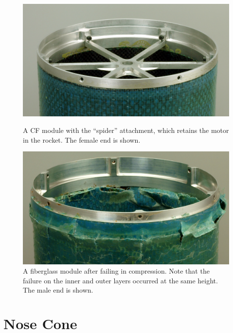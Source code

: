 \documentclass{aiaa-tc}%
\begin{document}
\begin{figure}[t]
	\centering
	\parbox{0.45\linewidth}
	{
		\centering
		\includegraphics[width=\linewidth]{../img/moduleWithSpider.png}
		\caption{A CF module with the ``spider'' attachment, which retains the motor in the rocket. The female end is shown.}
		\label{fig:module}
	}
	\hfill
	\parbox{0.45\linewidth}
	{
		\centering
		\includegraphics[width=\linewidth]{../img/FG_fracture.jpg}
		\caption{A fiberglass module after failing in compression. Note that the failure on the inner and outer layers occurred at the same height. The male end is shown.}
		\label{fig:crush}
	}
\end{figure}

\section{Nose Cone}\label{sec:noseCone}

\end{document}
